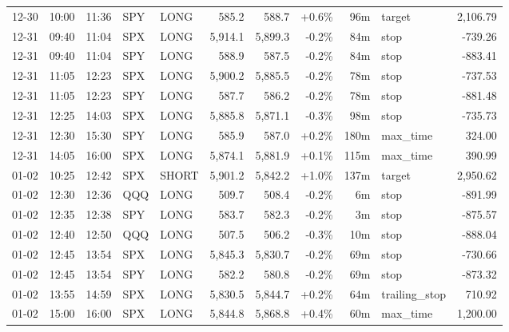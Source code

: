 \documentclass[11pt,a4paper,twoside]{article}
\begin{document}
\begin{center}
\begin{longtable}{>{\color{txtmain}}l l l l l r r r r >{\color{txtmain}}l r}
12-30 & 10:00 & 11:36 & SPY & LONG & 585.2 & 588.7 & \textcolor{wingreen}{+0.6\%} & 96m & target & \textcolor{wingreen}{2,106.79} \\
12-31 & 09:40 & 11:04 & SPX & LONG & 5,914.1 & 5,899.3 & \textcolor{lossred}{-0.2\%} & 84m & stop & \textcolor{lossred}{-739.26} \\
12-31 & 09:40 & 11:04 & SPY & LONG & 588.9 & 587.5 & \textcolor{lossred}{-0.2\%} & 84m & stop & \textcolor{lossred}{-883.41} \\
12-31 & 11:05 & 12:23 & SPX & LONG & 5,900.2 & 5,885.5 & \textcolor{lossred}{-0.2\%} & 78m & stop & \textcolor{lossred}{-737.53} \\
12-31 & 11:05 & 12:23 & SPY & LONG & 587.7 & 586.2 & \textcolor{lossred}{-0.2\%} & 78m & stop & \textcolor{lossred}{-881.48} \\
12-31 & 12:25 & 14:03 & SPX & LONG & 5,885.8 & 5,871.1 & \textcolor{lossred}{-0.3\%} & 98m & stop & \textcolor{lossred}{-735.73} \\
12-31 & 12:30 & 15:30 & SPY & LONG & 585.9 & 587.0 & \textcolor{wingreen}{+0.2\%} & 180m & max\_time & \textcolor{wingreen}{324.00} \\
12-31 & 14:05 & 16:00 & SPX & LONG & 5,874.1 & 5,881.9 & \textcolor{wingreen}{+0.1\%} & 115m & max\_time & \textcolor{wingreen}{390.99} \\
01-02 & 10:25 & 12:42 & SPX & SHORT & 5,901.2 & 5,842.2 & \textcolor{wingreen}{+1.0\%} & 137m & target & \textcolor{wingreen}{2,950.62} \\
01-02 & 12:30 & 12:36 & QQQ & LONG & 509.7 & 508.4 & \textcolor{lossred}{-0.2\%} & 6m & stop & \textcolor{lossred}{-891.99} \\
01-02 & 12:35 & 12:38 & SPY & LONG & 583.7 & 582.3 & \textcolor{lossred}{-0.2\%} & 3m & stop & \textcolor{lossred}{-875.57} \\
01-02 & 12:40 & 12:50 & QQQ & LONG & 507.5 & 506.2 & \textcolor{lossred}{-0.3\%} & 10m & stop & \textcolor{lossred}{-888.04} \\
01-02 & 12:45 & 13:54 & SPX & LONG & 5,845.3 & 5,830.7 & \textcolor{lossred}{-0.2\%} & 69m & stop & \textcolor{lossred}{-730.66} \\
01-02 & 12:45 & 13:54 & SPY & LONG & 582.2 & 580.8 & \textcolor{lossred}{-0.2\%} & 69m & stop & \textcolor{lossred}{-873.32} \\
01-02 & 13:55 & 14:59 & SPX & LONG & 5,830.5 & 5,844.7 & \textcolor{wingreen}{+0.2\%} & 64m & trailing\_stop & \textcolor{wingreen}{710.92} \\
01-02 & 15:00 & 16:00 & SPX & LONG & 5,844.8 & 5,868.8 & \textcolor{wingreen}{+0.4\%} & 60m & max\_time & \textcolor{wingreen}{1,200.00} \\

\end{longtable}
\end{center}
\end{document}
